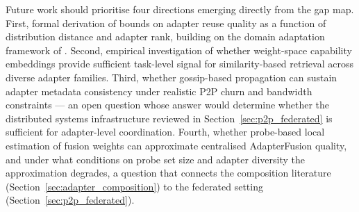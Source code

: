Future work should prioritise four directions emerging directly from the gap
map. First, formal derivation of bounds on adapter reuse quality as a function 
of distribution distance and adapter rank, building on the domain adaptation 
framework of \citet{BenDavid2010}. Second, empirical investigation of whether weight-space capability embeddings provide sufficient task-level signal for similarity-based retrieval across diverse adapter families.
Third, whether gossip-based propagation can sustain adapter metadata consistency under realistic P2P churn and bandwidth constraints — an open question whose answer would determine whether the distributed systems infrastructure reviewed in Section~\ref{sec:p2p_federated} is sufficient for adapter-level coordination. Fourth, whether probe-based local estimation of fusion weights can approximate centralised AdapterFusion quality, and under what conditions on probe set size and adapter diversity the approximation degrades, a question that connects the composition literature (Section~\ref{sec:adapter_composition}) to the federated setting (Section~\ref{sec:p2p_federated}).